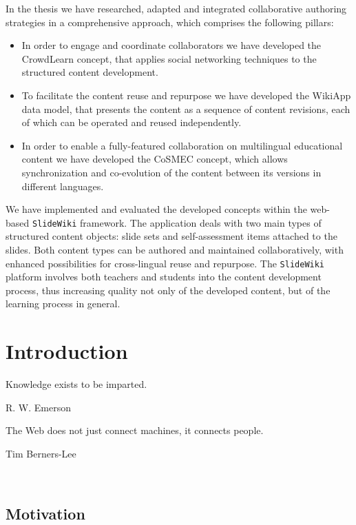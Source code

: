 \documentclass[PhD, Submit, ngerman,UKenglish,table]{scrbook}
\begin{document}
In the thesis we have researched, adapted and integrated collaborative authoring strategies in a comprehensive approach, which comprises the following pillars:
\begin{itemize}
\item In order to engage and coordinate collaborators we have developed the CrowdLearn concept, that applies social networking techniques to the structured content development.
\item To facilitate the content reuse and repurpose we have developed the WikiApp data model, that presents the content as a sequence of content revisions, each of which can be operated and reused independently.
\item In order to enable a fully-featured collaboration on multilingual educational content we have developed the CoSMEC concept, which allows synchronization and co-evolution of the content between its versions in different languages.
\end{itemize}

We have implemented and evaluated the developed concepts within the web-based \texttt{SlideWiki} framework.
The application deals with two main types of structured content objects: slide sets and self-assessment items attached to the slides.
Both content types can be authored and maintained collaboratively, with enhanced possibilities for cross-lingual reuse and repurpose.  
The \texttt{SlideWiki} platform involves both teachers and students into the content development process, thus increasing quality not only of the developed content, but of the learning process in general.


\tableofcontents

\mainmatter
\pagestyle{scrheadings}



\chapter{Introduction}
\label{chapter:introduction}

\epigraph{Knowledge exists to be imparted.}{R. W. Emerson}
\epigraph{The Web does not just connect machines, it connects people.}{Tim Berners-Lee}

$  $\section{Motivation}
\label{section:motivation}
\end{document}
